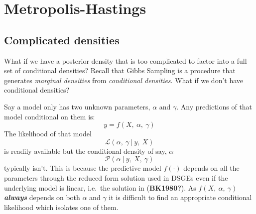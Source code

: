 \documentclass[
  letterpaper,
]{book}
\begin{document}
\hypertarget{metropolis-hastings}{%
\chapter{Metropolis-Hastings}\label{metropolis-hastings}}

\hypertarget{complicated-densities}{%
\section{Complicated densities}\label{complicated-densities}}

What if we have a posterior density that is too complicated to factor
into a full set of conditional densities? Recall that Gibbs Sampling is
a procedure that generates \emph{marginal densities} from
\emph{conditional densities}. What if we don't have conditional
densities?

\begin{tcolorbox}[enhanced jigsaw, breakable, left=2mm, arc=.35mm, toptitle=1mm, colbacktitle=quarto-callout-tip-color!10!white, opacityback=0, bottomrule=.15mm, leftrule=.75mm, opacitybacktitle=0.6, title=\textcolor{quarto-callout-tip-color}{\faLightbulb}\hspace{0.5em}{Why can't we use Gibbs for DSGEs?}, colframe=quarto-callout-tip-color-frame, coltitle=black, titlerule=0mm, toprule=.15mm, bottomtitle=1mm, rightrule=.15mm, colback=white]

Say a model only has two unknown parameters, \(\alpha\) and \(\gamma\).
Any predictions of that model conditional on them is: \begin{equation}
  y = f(X,\ \alpha,\ \gamma)
\end{equation} The likelihood of that model \begin{equation}
  \mathcal{L}(\alpha,\ \gamma\ | \ y,\ X)
\end{equation} is readily available but the conditional density of say,
\(\alpha\) \begin{equation}
  \mathcal{P}(\alpha\ | \ y,\ X,\ \gamma)
\end{equation} typically isn't. This is because the predictive model
\(f(\cdot)\) depends on all the parameters through the reduced form
solution used in DSGEs even if the underlying model is linear, i.e.~the
solution in (\textbf{BK1980?}). As \(f(X,\ \alpha,\ \gamma)\)
\textbf{\emph{always}} depends on both \(\alpha\) and \(\gamma\) it is
difficult to find an appropriate conditional likelihood which isolates
one of them.

\end{tcolorbox}
\end{document}
